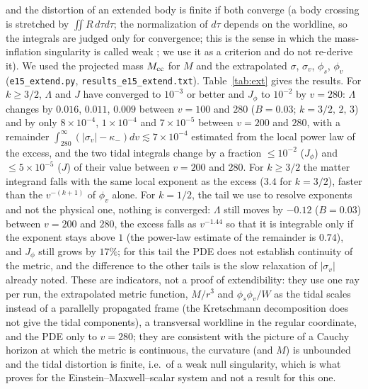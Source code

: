 \documentclass[11pt]{article}
\begin{document}
and the distortion of an extended body is finite if both converge (a body crossing is stretched by $\iint\!R\,d\tau d\tau$; the normalization of $d\tau$ depends on the worldline, so the integrals are judged only for convergence; this is the sense in which the mass-inflation singularity is called weak \citep{Ori1991}; we use it as a criterion and do not re-derive it). We used the projected mass $M_{\rm cc}$ for $M$ and the extrapolated $\sigma$, $\sigma_v$, $\phi_s$, $\phi_v$ (\texttt{e15\_extend.py}, \texttt{results\_e15\_extend.txt}). Table~\ref{tab:ext} gives the results. For $k\ge3/2$, $\Lambda$ and $J$ have converged to $10^{-3}$ or better and $J_\phi$ to $10^{-2}$ by $v=280$: $\Lambda$ changes by $0.016$, $0.011$, $0.009$ between $v=100$ and $280$ ($B=0.03$; $k=3/2,\,2,\,3$) and by only $8\times10^{-4}$, $1\times10^{-4}$ and $7\times10^{-5}$ between $v=200$ and $280$, with a remainder $\int_{280}^\infty(|\sigma_v|-\kappa_-)dv\lesssim7\times10^{-4}$ estimated from the local power law of the excess, and the two tidal integrals change by a fraction $\le10^{-2}$ ($J_\phi$) and $\le5\times10^{-5}$ ($J$) of their value between $v=200$ and $280$. For $k\ge3/2$ the matter integrand falls with the same local exponent as the excess ($3.4$ for $k=3/2$), faster than the $v^{-(k+1)}$ of $\phi_v$ alone. For $k=1/2$, the tail we use to resolve exponents and not the physical one, nothing is converged: $\Lambda$ still moves by $-0.12$ ($B=0.03$) between $v=200$ and $280$, the excess falls as $v^{-1.44}$ so that it is integrable only if the exponent stays above $1$ (the power-law estimate of the remainder is $0.74$), and $J_\phi$ still grows by $17\%$; for this tail the PDE does not establish continuity of the metric, and the difference to the other tails is the slow relaxation of $|\sigma_v|$ already noted. These are indicators, not a proof of extendibility: they use one ray per run, the extrapolated metric function, $M/r^3$ and $\phi_s\phi_v/W$ as the tidal scales instead of a parallelly propagated frame (the Kretschmann decomposition does not give the tidal components), a transversal worldline in the regular coordinate, and the PDE only to $v=280$; they are consistent with the picture of a Cauchy horizon at which the metric is continuous, the curvature (and $M$) is unbounded and the tidal distortion is finite, i.e.\ of a weak null singularity, which is what \citet{Dafermos2005} proves for the Einstein--Maxwell--scalar system and not a result for this one.
\end{document}
